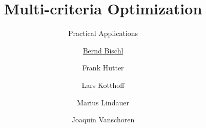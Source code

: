 


\newcommand{\q}[0]{\mathbf{q}}
\newcommand{\Xspace}[0]{\mathcal{X}}
\newcommand{\inducer}{\mathcal{I}}

\title[AutoML: Overview]{Multi-criteria Optimization}
\subtitle{Practical Applications}
\author[Bernd Bischl]{\underline{Bernd Bischl} \and Frank Hutter \and Lars Kotthoff\newline \and Marius Lindauer \and Joaquin Vanschoren}
\institute{}
\date{}






	\maketitle

